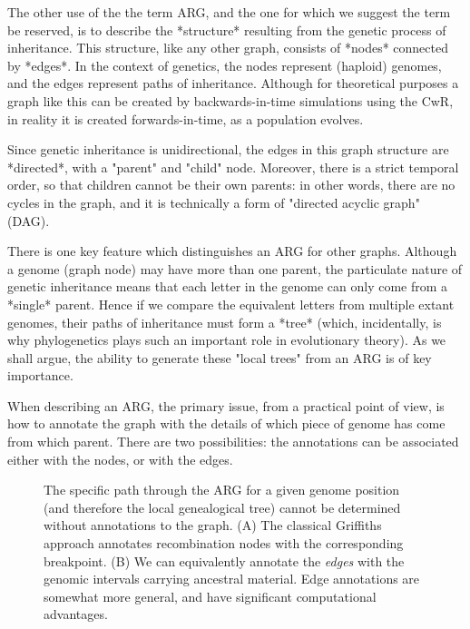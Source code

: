 \documentclass{article}
\begin{document}

The other use of the the term ARG, and the one for which we suggest the term be
reserved, is to describe the *structure* resulting from the genetic process of
inheritance. This structure, like any other graph, consists of *nodes*
connected by *edges*. In the context of genetics, the nodes represent (haploid)
genomes, and the edges represent paths of inheritance. Although for theoretical
purposes a graph like this can be created by backwards-in-time simulations
using the CwR, in reality it is created forwards-in-time, as a population
evolves.

Since genetic inheritance is unidirectional, the edges in this graph structure
are *directed*, with a "parent" and "child" node. Moreover, there is a strict
temporal order, so that children cannot be their own parents: in other words,
there are no cycles in the graph, and it is technically a form of "directed
acyclic graph" (DAG).


There is one key feature which distinguishes an ARG for other graphs. Although
a genome (graph node) may have more than one parent, the particulate nature of
genetic inheritance means that each letter in the genome can only come from a
*single* parent. Hence if we compare the equivalent letters from multiple
extant genomes, their paths of inheritance must form a *tree* (which,
incidentally, is why phylogenetics plays such an important role in evolutionary
theory). As we shall argue, the ability to generate these "local trees" from an
ARG is of key importance.

When describing an ARG, the primary issue, from a practical point of view, is
how to annotate the graph with the details of which piece of genome has come
from which parent. There are two possibilities: the annotations can be
associated either with the nodes, or with the edges.

\begin{figure}
\vspace{5em}
\caption{\label{fig-arg-annotations}
The specific path through the ARG for a given genome position (and therefore
the local genealogical tree) cannot be determined without annotations
to the graph. (A) The classical Griffiths approach annotates recombination
nodes with the corresponding breakpoint. (B) We can equivalently
annotate the \emph{edges} with the genomic intervals carrying ancestral
material. Edge annotations are somewhat more general, and have
significant computational advantages.}
\end{figure}
\end{document}
